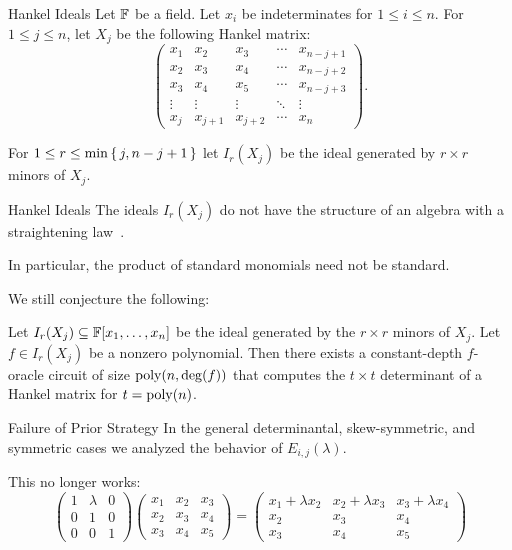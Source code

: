 \documentclass[aspectratio=169]{beamer}
\begin{document}
\begin{frame}{Hankel Ideals}
  Let $\mathbb{F}$ be a field.
  Let $x_{i}$ be indeterminates for $1 \leq i \leq n$.
  For $1 \leq  j \leq n$, let $X_j$ be the following Hankel matrix:
  \[
    \begin{pmatrix}
      x_1 & x_2 & x_3 & \cdots & x_{n - j + 1} \\
      x_2 & x_3 & x_4 & \cdots & x_{n - j + 2} \\
      x_3 & x_4 & x_5 & \cdots & x_{n - j + 3} \\
      \vdots & \vdots & \vdots & \ddots & \vdots \\
      x_{j} & x_{j + 1} & x_{j + 2} & \cdots & x_{n}
    \end{pmatrix}.
  \]

  \pause

  For $1 \leq r \leq \min\set{j, n - j + 1}$ let $I_r(X_j)$ be the ideal generated by $r \times r$ minors of $X_j$.
\end{frame}

\begin{frame}{Hankel Ideals}
  The ideals $I_r(X_j)$ do not have the structure of an algebra with a straightening law~\cite{Con98}.

  In particular, the product of standard monomials need not be standard.

  \pause

  We still conjecture the following:
  \begin{conj}
    Let $I_r(X_j) \subseteq \mathbb{F}[x_1, \ldots, x_n]$ be the ideal generated by the $r \times r$ minors of $X_j$.
    Let $f \in I_r(X_j)$ be a nonzero polynomial.
    Then there exists a constant-depth $f$-oracle circuit of size $\operatorname{poly}(n, \deg(f))$ that computes the $t \times t$ determinant of a Hankel matrix for $t = \operatorname{poly}(n)$.
  \end{conj}
\end{frame}

\begin{frame}{Failure of Prior Strategy}
  In the general determinantal, skew-symmetric, and symmetric cases we analyzed the behavior of $E_{i, j}(\lambda)$.

  \pause

  This no longer works:
  \[
    \begin{pmatrix}
      1 & \lambda & 0 \\
      0 & 1 & 0 \\
      0 & 0 & 1
    \end{pmatrix}
    \begin{pmatrix}
      x_1 & x_2 & x_3 \\
      x_2 & x_3 & x_4 \\
      x_3 & x_4 & x_5
    \end{pmatrix}
    =
    \begin{pmatrix}
      x_1 + \lambda x_2 & x_2 + \lambda x_3 & x_3 + \lambda x_4 \\
      x_2 & x_3 & x_4 \\
      x_3 & x_4 & x_5
    \end{pmatrix}
  \]
\end{frame}
\end{document}
